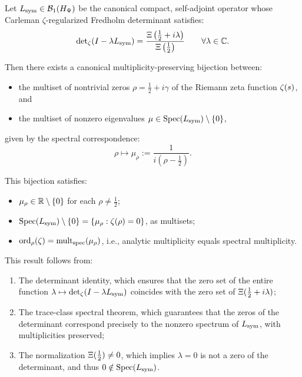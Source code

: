 \begin{theorem}
\label{thm:spectral_zero_bijection_revised}
Let \( L_{\mathrm{sym}} \in \mathcal{B}_1(H_{\Psi}) \) be the canonical compact, self-adjoint operator whose Carleman \(\zeta\)-regularized Fredholm determinant satisfies:
\[
\det\nolimits_\zeta(I - \lambda L_{\mathrm{sym}}) = \frac{\Xi\left(\tfrac{1}{2} + i\lambda\right)}{\Xi\left(\tfrac{1}{2}\right)} \qquad \forall \lambda \in \mathbb{C}.
\]

Then there exists a canonical multiplicity-preserving bijection between:
\begin{itemize}
  \item the multiset of nontrivial zeros \( \rho = \tfrac{1}{2} + i\gamma \) of the Riemann zeta function \( \zeta(s) \), and
  \item the multiset of nonzero eigenvalues \( \mu \in \operatorname{Spec}(L_{\mathrm{sym}}) \setminus \{0\} \),
\end{itemize}
given by the spectral correspondence:
\[
\rho \longmapsto \mu_\rho := \frac{1}{i(\rho - \tfrac{1}{2})}.
\]

\medskip

\noindent
This bijection satisfies:
\begin{itemize}
  \item \( \mu_\rho \in \mathbb{R} \setminus \{0\} \) for each \( \rho \ne \tfrac{1}{2} \);
  \item \( \operatorname{Spec}(L_{\mathrm{sym}}) \setminus \{0\} = \left\{ \mu_\rho : \zeta(\rho) = 0 \right\} \), as multisets;
  \item \( \operatorname{ord}_\rho(\zeta) = \operatorname{mult}_{\mathrm{spec}}(\mu_\rho) \), i.e., analytic multiplicity equals spectral multiplicity.
\end{itemize}

\medskip

\noindent
This result follows from:
\begin{enumerate}
  \item The determinant identity, which ensures that the zero set of the entire function \( \lambda \mapsto \det\nolimits_\zeta(I - \lambda L_{\mathrm{sym}}) \) coincides with the zero set of \( \Xi(\tfrac{1}{2} + i\lambda) \);
  \item The trace-class spectral theorem, which guarantees that the zeros of the determinant correspond precisely to the nonzero spectrum of \( L_{\mathrm{sym}} \), with multiplicities preserved;
  \item The normalization \( \Xi(\tfrac{1}{2}) \ne 0 \), which implies \( \lambda = 0 \) is not a zero of the determinant, and thus \( 0 \notin \operatorname{Spec}(L_{\mathrm{sym}}) \).
\end{enumerate}
\end{theorem}

